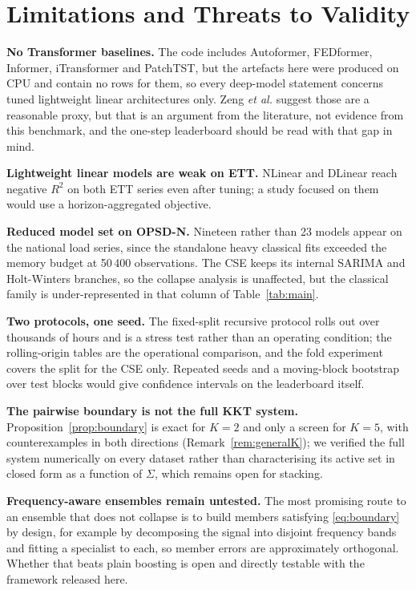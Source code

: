 \documentclass[journal]{IEEEtran}
\begin{document}
\section{Limitations and Threats to Validity}
\label{sec:limits}
\textbf{No Transformer baselines.} The code includes Autoformer, FEDformer, Informer, iTransformer and PatchTST, but the artefacts here were produced on CPU and contain no rows for them, so every deep-model statement concerns tuned lightweight linear architectures only. Zeng \emph{et al.} \cite{r15} suggest those are a reasonable proxy, but that is an argument from the literature, not evidence from this benchmark, and the one-step leaderboard should be read with that gap in mind.

\textbf{Lightweight linear models are weak on ETT.} NLinear and DLinear reach negative $R^2$ on both ETT series even after tuning; a study focused on them would use a horizon-aggregated objective.

\textbf{Reduced model set on OPSD-N.} Nineteen rather than 23 models appear on the national load series, since the standalone heavy classical fits exceeded the memory budget at 50\,400 observations. The CSE keeps its internal SARIMA and Holt-Winters branches, so the collapse analysis is unaffected, but the classical family is under-represented in that column of Table~\ref{tab:main}.

\textbf{Two protocols, one seed.} The fixed-split recursive protocol rolls out over thousands of hours and is a stress test rather than an operating condition; the rolling-origin tables are the operational comparison, and the fold experiment covers the split for the CSE only. Repeated seeds and a moving-block bootstrap over test blocks would give confidence intervals on the leaderboard itself.

\textbf{The pairwise boundary is not the full KKT system.} Proposition~\ref{prop:boundary} is exact for $K = 2$ and only a screen for $K = 5$, with counterexamples in both directions (Remark~\ref{rem:generalK}); we verified the full system numerically on every dataset rather than characterising its active set in closed form as a function of $\Sigma$, which remains open for stacking.

\textbf{Frequency-aware ensembles remain untested.} The most promising route to an ensemble that does not collapse is to build members satisfying \eqref{eq:boundary} by design, for example by decomposing the signal into disjoint frequency bands and fitting a specialist to each, so member errors are approximately orthogonal. Whether that beats plain boosting is open and directly testable with the framework released here.
\end{document}
